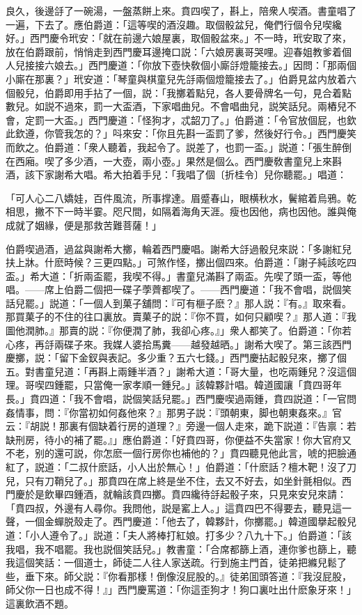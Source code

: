 良久，後邊㧱了一碗湯，一盤蒸餅上來。賁四喫了，斟上，陪衆人喫酒。書童唱了一遍，下去了。應伯爵道：「這等喫的酒沒趣。取個骰盆兒，俺們行個令兒喫纔好。」西門慶令玳安：「就在前邊六娘屋裏，取個骰盆來。」不一時，玳安取了來，放在伯爵跟前，悄悄走到西門慶耳邊掩口説：「六娘房裏哥哭哩。迎春姐教爹着個人兒接接六娘去。」西門慶道：「你放下壺快敎個小廝㧱燈籠接去。」因問：「那兩個小廝在那裏？」玳安道：「琴童與棋童兒先㧱兩個燈籠接去了。」伯爵見盆内放着六個骰兒，伯爵即用手拈了一個，説：「我擲着點兒，各人要骨牌名一句，見合着點數兒。如説不過來，罰一大盃酒，下家唱曲兒。不會唱曲兒，説笑話兒。兩樁兒不會，定罰一大盃。」西門慶道：「怪狗才，忒韶刀了。」伯爵道：「令官放個屁，也欽此欽遵，你管我怎的？」呌來安：「你且先斟一盃罰了爹，然後好行令。」西門慶笑而飲之。伯爵道：「衆人聽着，我起令了。説差了，也罰一盃。」説道：「張生醉倒在西廂。喫了多少酒，一大壺，兩小壺。」果然是個么。西門慶敎書童兒上來斟酒，該下家謝希大唱。希大拍着手兒：「我唱了個〔折桂令〕兒你聽罷。」唱道：

\begin{myquote}
「可人心二八嬌娃，百件風流，所事撑達。眉蹙春山，眼横秋水，鬢綰着烏鴉。乾相思，撇不下一時半霎。咫尺間，如隔着海角天涯。瘦也因他，病也因他。誰與俺成就了姻緣，便是那救苦難菩薩！」
\end{myquote}

伯爵喫過酒，過盆與謝希大擲，輪着西門慶唱。謝希大㧱過骰兒來説：「多謝紅兒扶上牀。什麽時候？三更四點。」可煞作怪，擲出個四來。伯爵道：「謝子純該吃四盃。」希大道：「折兩盃罷，我喫不得。」書童兒滿斟了兩盃。先喫了頭一盃，等他唱。——席上伯爵二個把一碟子荸薺都喫了。——西門慶道：「我不會唱，説個笑話兒罷。」説道：「一個人到菓子舖問：『可有榧子麽？』那人説：『有。』取來看。那買菓子的不住的往口裏放。賣菓子的説：『你不買，如何只顧喫？』那人道：『我圖他潤肺。』那賣的説：『你便潤了肺，我卻心疼。』」衆人都笑了。伯爵道：「你若心疼，再㧱兩碟子來。我媒人婆拾馬糞——越發越晒。」謝希大喫了。第三該西門慶擲，説：「留下金釵與表記。多少重？五六七錢。」西門慶拈起骰兒來，擲了個五。對書童兒道：「再斟上兩鍾半酒？」謝希大道：「哥大量，也吃兩鍾兒？沒這個理。哥喫四鍾罷，只當俺一家孝順一鍾兒。」該韓夥計唱。韓道國讓「賁四哥年長。」賁四道：「我不會唱，説個笑話兒罷。」西門慶喫過兩鍾，賁四説道：「一官問姦情事，問：『你當初如何姦他來？』那男子説：『頭朝東，脚也朝東姦來。』官云：『胡説！那裏有個缺着行房的道理？』旁邊一個人走來，跪下説道：『告禀：若缺刑房，待小的補了罷。』」應伯爵道：「好賁四哥，你便益不失當家！你大官府又不老，别的還可説，你怎麽一個行房你也補他的？」賁四聽見他此言，唬的把臉通紅了，説道：「二叔什麽話，小人出於無心！」伯爵道：「什麽話？檀木靶！沒了刀兒，只有刀鞘兒了。」那賁四在席上終是坐不住，去又不好去，如坐針氈相似。西門慶於是飲畢四鍾酒，就輪該賁四擲。賁四纔待㧱起骰子來，只見來安兒來請：「賁四叔，外邊有人尋你。我問他，説是窰上人。」這賁四巴不得要去，聽見這一聲，一個金蟬脱殼走了。西門慶道：「他去了，韓夥計，你擲罷。」韓道國擧起骰兒道：「小人遵令了。」説道：「夫人將棒打紅娘。打多少？八九十下。」伯爵道：「該我唱，我不唱罷。我也説個笑話兒。」教書童：「合席都篩上酒，連你爹也篩上，聽我這個笑話：一個道士，師徒二人往人家送疏。行到施主門首，徒弟把縧兒鬆了些，垂下來。師父説：『你看那樣！倒像沒屁股的。』徒弟囬頭答道：『我沒屁股，師父你一日也成不得！』」西門慶罵道：「你這歪狗才！狗口裏吐出什麽象牙來！」這裏飲酒不題。

